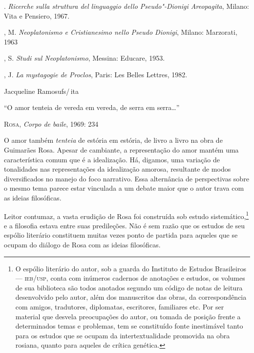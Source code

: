 {\begin{description}
\titidem. \emph{Ricerche} \emph{sulla struttura del
linguaggio dello Pseudo"-Dionigi Areopagita}, Milano: Vita e Pensiero,
1967.

, M. \emph{Neoplatonismo e Cristianesimo nello Pseudo
Dionigi}, Milano: Marzorati, 1963

, S. \emph{Studi sul Neoplatonismo}, Messina: Educare, 1953.

, J. \emph{La mystagogie de Proclos}, Paris: Les Belles
Lettres, 1982.
\end{description}

%
	{Jacqueline Ramos}{ufs/\,ita}


\epigraph{“O amor tenteia de vereda em vereda, de serra em
serra\ldots{}”}{\textsc{Rosa}, \emph{Corpo de baile}, 1969: 234}

O amor também \emph{tenteia} de estória em estória, de livro a livro na obra
de Guimarães Rosa. Apesar de cambiante, a representação do amor
mantém uma característica comum que é a idealização. Há, digamos, uma
variação de tonalidades nas representações da idealização amorosa,
resultante de modos diversificados no manejo do foco narrativo. Essa
alternância de perspectivas sobre o mesmo tema parece estar vinculada
a um debate maior que o autor trava com as ideias filosóficas.

Leitor contumaz, a vasta erudição de Rosa foi construída sob estudo
sistemático,\footnote{ O espólio literário do autor, sob a guarda do
Instituto de Estudos Brasileiros --- \textsc{ieb}/\textsc{usp}, conta com inúmeros
cadernos de anotações e estudos, os volumes de sua biblioteca são
todos anotados segundo um código de notas de leitura desenvolvido
pelo autor, além dos manuscritos das obras, da correspondência com
amigos, tradutores, diplomatas, escritores, familiares etc. Por ser
material que desvela preocupações do autor, ou tomada de posição
frente a determinados temas e problemas, tem se constituído fonte
inestimável tanto para os estudos que se ocupam da intertextualidade
promovida na obra rosiana, quanto para aqueles de crítica
genética.} e a filosofia estava entre suas predileções. Não é
sem razão que os estudos de seu espólio literário constituem muitas
vezes ponto de partida para aqueles que se ocupam do diálogo de Rosa
com as ideias filosóficas.

}
